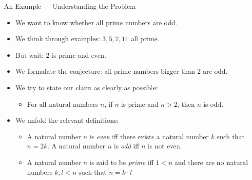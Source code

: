 \documentclass[../slides.tex]{subfiles}
\begin{document}
\begin{frame}{An Example --- Understanding the Problem}


	\begin{itemize}
	
		\item We want to know whether all prime numbers are odd.
		
		\item We think through examples: $3,5,7,11$ all prime.
		
		\item But wait: $2$ is prime and even.
		
		\item We formulate the conjecture: all prime numbers bigger than 2 are odd.
		
		\item We try to state our claim as clearly as possible:
		
		\begin{itemize}
		
			\item For all natural numbers $n$, if $n$ is prime and $n>2$, then $n$ is odd.
		
		\end{itemize}
		
		\item We unfold the relevant definitions:
		
			\begin{itemize}
			
				\item A natural number $n$ is \emph{even} iff there exists a natural number $k$ such that $n=2k$. A natural number $n$ is \emph{odd} iff $n$ is not even.
				
				\item A natural number $n$ is said to be \emph{prime} iff $1<n$ and  there are no natural numbers $k,l<n$ such that $n=k\cdot l$

			
			\end{itemize}
	
	\end{itemize}
	

\end{frame}
\end{document}
